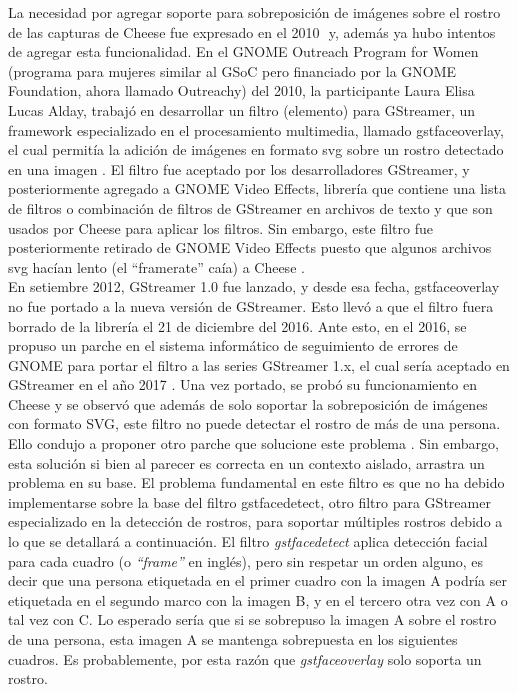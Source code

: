 \documentclass[a4paper,openright,12pt]{report}
\begin{document}
La necesidad por agregar soporte para sobreposición de imágenes sobre el rostro
de las capturas de Cheese fue expresado en el 2010 ⁠\cite{Bug6279256} y, además
ya hubo intentos de agregar esta funcionalidad. En el GNOME Outreach Program for
Women (programa para mujeres similar al GSoC pero financiado por la GNOME
Foundation, ahora llamado Outreachy) del 2010, la participante Laura Elisa Lucas
Alday, trabajó en desarrollar un filtro (elemento) para GStreamer, un framework
especializado en el procesamiento multimedia, llamado gstfaceoverlay, el cual
permitía la adición de imágenes en formato svg sobre un rostro detectado en una
imagen \cite{faceoverlay}\cite{gopw1}. El filtro fue aceptado por los
desarrolladores GStreamer, y posteriormente agregado a GNOME Video Effects,
librería que contiene una lista de filtros o combinación de filtros de GStreamer
en archivos de texto y que son usados por Cheese para aplicar los filtros. Sin
embargo, este filtro fue posteriormente retirado de GNOME Video Effects puesto
que algunos archivos svg hacían lento (el “framerate” caía) a Cheese
\cite{Bug6641489}.\\


En setiembre 2012, GStreamer 1.0 fue lanzado, y desde esa fecha, gstfaceoverlay
no fue portado a la nueva versión de GStreamer. Esto llevó a que el filtro fuera
borrado de la librería el 21 de diciembre del 2016. Ante esto, en el 2016, se
propuso un parche en el sistema informático de seguimiento de errores de GNOME
para portar el filtro a las
series GStreamer 1.x, el cual sería aceptado en GStreamer en el año 2017
\cite{Bug7640127}. Una vez portado, se probó su funcionamiento en Cheese
\cite{CFOCHfunnyStickersCheese} y se observó que además de solo soportar la
sobreposición de imágenes con formato SVG, este filtro no puede detectar el
rostro de más de una persona. Ello condujo a proponer otro parche que solucione
este problema \cite{Bug7691771}. Sin embargo, esta solución si bien al parecer
es correcta en un contexto aislado, arrastra un problema en su base. El problema
fundamental en este filtro es que no ha debido implementarse sobre la base del
filtro gstfacedetect, otro filtro para GStreamer especializado en la detección
de rostros, para soportar múltiples rostros debido a lo que se detallará a
continuación. El filtro \textit{gstfacedetect} aplica detección facial para
cada cuadro (o \textit{``frame''} en inglés), pero sin respetar un orden alguno,
es decir que una persona etiquetada en el primer cuadro con la imagen A podría
ser etiquetada en el segundo marco con la imagen B, y en el tercero otra vez
con A o tal vez con C. Lo esperado sería que si se sobrepuso la imagen A sobre
el rostro de una persona, esta imagen A se mantenga sobrepuesta en los
siguientes cuadros. Es probablemente, por esta razón que \textit{gstfaceoverlay}
solo soporta un rostro.\\
\end{document}

